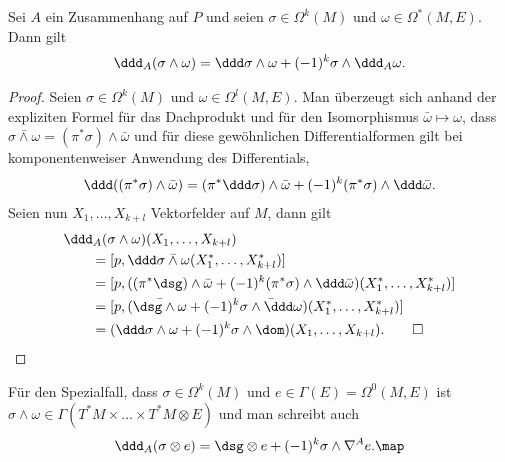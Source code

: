 \documentclass[%
	paper=a5,%
	fleqn,%
	DIV=18,%
	BCOR=0mm,
	fontsize=11pt,
	titlepage=false,%
	bibliography=totoc,
	DIV=18,%
	twoside=true,
	pdftitle=Riemannsche Geometrie,
	pdfauthor=Uwe Semmelmann,
	numbers=noendperiod]%
	{scrbook}
\begin{document}
\begin{lem}
Sei $A$ ein Zusammenhang auf $P$ und seien $\sigma\in\Omega^k(M)$ und
$\omega\in \Omega^*(M,E)$. Dann gilt
\begin{align*}
\ddd_A(\sigma\wedge \omega) = \ddd\sigma\wedge \omega + (-1)^k\sigma \wedge
\ddd_A\omega.
\end{align*}
\end{lem}
\begin{proof}
Seien $\sigma\in \Omega^k(M)$ und $\omega\in\Omega^l(M,E)$. Man überzeugt sich
anhand der expliziten Formel für das Dachprodukt und für den Isomorphismus
$\bar{\omega}\mapsto \omega$, dass $\bar{\sigma\wedge\omega} =
(\pi^*\sigma)\wedge\bar{\omega}$ und für diese gewöhnlichen Differentialformen gilt bei komponentenweiser Anwendung des Differentials,
\begin{align*}
\ddd((\pi^*\sigma)\wedge \bar{\omega}) = 
(\pi^* \ddd\sigma) \wedge\bar{\omega}
+(-1)^k (\pi^* \sigma) \wedge \ddd\bar{\omega}. 
\end{align*}
Seien nun $X_1,\ldots,X_{k+l}$ Vektorfelder auf $M$, dann gilt 
\begin{align*}
&\ddd_A (\sigma\wedge \omega)(X_1,\ldots,X_{k+l})\\
&\qquad= [p,\ddd \bar{\sigma\wedge \omega}(X_1^*,\ldots,X_{k+l}^*)]\\
&\qquad= [p,((\pi^*\dsg)\wedge \bar{\omega} +
(-1)^k(\pi^*\sigma)\wedge\ddd\bar{\omega})(X_1^*,\ldots,X_{k+l}^*)]\\
&\qquad=[p,(\bar{\dsg\wedge \omega} +
(-1)^k\bar{\sigma\wedge\ddd\omega})(X_1^*,\ldots,X_{k+l}^*)]\\
&\qquad=(\ddd\sigma\wedge \omega +
(-1)^k\sigma\wedge\dom)(X_1,\ldots,X_{k+l}).\qed
\end{align*}
\end{proof}

\begin{rem}
Für den Spezialfall, dass $\sigma\in\Omega^k(M)$ und $e\in\Gamma(E) =
\Omega^0(M,E)$ ist $\sigma\wedge\omega\in \Gamma(T^*M\times \ldots
\times T^*M \otimes E)$ und man schreibt auch
\begin{align*}
\ddd_A(\sigma\otimes e) = 
\dsg\otimes e + (-1)^k \sigma\wedge \nabla^A e.\map
\end{align*}
\end{rem}
\end{document}
